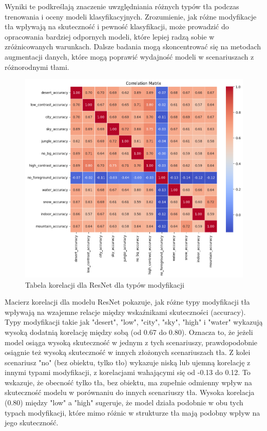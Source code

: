Wyniki te podkreślają znaczenie uwzględniania różnych typów tła podczas trenowania i oceny modeli klasyfikacyjnych. Zrozumienie, jak różne 
modyfikacje tła wpływają na skuteczność i pewność klasyfikacji, może prowadzić do opracowania bardziej odpornych modeli, które lepiej radzą 
sobie w zróżnicowanych warunkach. Dalsze badania mogą skoncentrować się na metodach augmentacji danych, które mogą poprawić wydajność modeli w 
scenariuszach z różnorodnymi tłami.
\begin{figure}
	\centering\includegraphics[width=.9\textwidth]{img/korelacja_resnet_typ}
	\caption{Tabela korelacji dla ResNet dla typów modyfikacji}  
    \label{rys:corelation_resnet_type}
\end{figure}

Macierz korelacji dla modelu ResNet pokazuje, jak różne typy modyfikacji tła wpływają 
na wzajemne relacje między wskaźnikami skuteczności (accuracy). Typy modyfikacji 
takie jak "desert", "low", "city", "sky", "high" i "water" wykazują wysoką dodatnią 
korelację między sobą (od 0.67 do 0.80). Oznacza to, że jeżeli model osiąga wysoką 
skuteczność w jednym z tych scenariuszy, prawdopodobnie osiągnie też wysoką 
skuteczność w innych złożonych scenariuszach tła. Z kolei scenariusz "no" 
(bez obiektu, tylko tło) wykazuje niską lub ujemną korelację z innymi typami 
modyfikacji, z korelacjami wahającymi się od -0.13 do 0.12. To wskazuje, że obecność 
tylko tła, bez obiektu, ma zupełnie odmienny wpływ na skuteczność modelu w porównaniu 
do innych scenariuszy tła. Wysoka korelacja (0.80) między "low" a "high" sugeruje, 
że model działa podobnie w obu tych typach modyfikacji, które mimo różnic w 
strukturze tła mają podobny wpływ na jego skuteczność.

